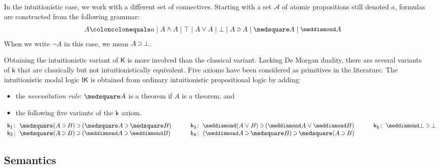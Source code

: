 \documentclass{article}
\newcommand*{\NOT}{\neg}
\newcommand*{\AND}{\mathbin{\scalebox{.85}{\raise.1ex\hbox{\large$\wedge$}}}}
\newcommand*{\TOP}{\mathord{\top}}
\newcommand*{\OR}{\mathbin{\scalebox{.85}{\raise.1ex\hbox{\large$\vee$}}}}
\newcommand*{\BOT}{\mathord{\bot}}
\newcommand*{\IMP}{\mathbin{\scalebox{.6}{\raise.4ex\hbox{\large$\bm\supset$}}}}%
\newcommand*{\BOX}{\mathord{\medsquare}}
\newcommand*{\DIA}{\mathord{\scalebox{.9}{\raise.1ex\hbox{$\meddiamond$}}}}
\newcommand*{\ax}[1]{\mathsf{#1}}
\newcommand*{\kax}[1][]		{\ax{k_{#1}}}
\newcommand*{\A}{\mathcal{A}}
\newcommand*{\sys}[1]{\ensuremath{\mathsf{#1}}}%
\newcommand*{\K}{\sys{K}}
\newcommand*{\IK}{\sys{IK}}
\begin{document}
In the intuitionistic case, we work with a different set of connectives.
%
Starting with a set $\A$ of atomic propositions still denoted $a$, formulas are constructed from the following grammar:
%
\begin{align*}
A & \coloncolonequals
a \mid A \AND A \mid \TOP \mid A \OR A \mid \BOT \mid A \IMP A \mid \BOX A \mid \DIA A
\end{align*}
%
When we write $\NOT A$ in this case, we mean $A \IMP \BOT$.

Obtaining the intuitionistic variant of $\K$ is more involved than the classical variant.
%
Lacking De Morgan duality, there are several variants of $\kax$ that are classically but not intuitionistically equivalent.
%
Five axioms have been considered as primitives in the literature.
%
The intuitionistic modal logic $\IK$ is obtained from ordinary intuitionistic propositional logic by adding:
%
\begin{itemize}
	\item the \emph{necessitation rule}: $\BOX A$ is a theorem if $A$ is a theorem; and
	\item the following five variants of the $\kax$ axiom.
	\begin{equation*}
	\label{eq:ik}\hskip-2em
	\begin{array}[t]{r@{\;}l}
	\kax[1]\colon&\BOX(A\IMP B)\IMP(\BOX A\IMP\BOX B)\\%
	\kax[2]\colon&\BOX(A\IMP B)\IMP(\DIA A\IMP\DIA B)\\%
	\end{array}
	\qquad
	\begin{array}[t]{r@{\;}l}
	\kax[3]\colon&\DIA(A\OR B)\IMP(\DIA A\OR\DIA B)\\%
	\kax[4]\colon&(\DIA A\IMP \BOX B)\IMP\BOX(A\IMP B)\\%
	\end{array}
	\qquad
	\begin{array}[t]{r@{\;}l}
	\kax[5]\colon&\DIA\BOT\IMP\BOT
	\end{array}
	\end{equation*}
\end{itemize}

\subsection{Semantics}
\end{document}
